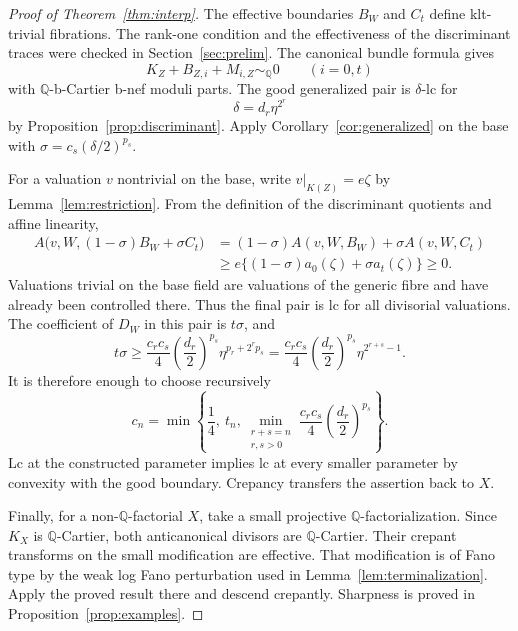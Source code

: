 \documentclass[11pt,reqno]{amsart}
\numberwithin{equation}{section}
\theoremstyle{definition}
\theoremstyle{remark}
\newcommand{\Q}{\mathbb Q}
\newcommand{\simq}{\sim_{\Q}}
\begin{document}
\begin{proof}[Proof of Theorem~\ref{thm:interp}]
The effective boundaries $B_W$ and $C_t$ define klt-trivial fibrations. The rank-one condition and the effectiveness of the discriminant traces were checked in Section~\ref{sec:prelim}. The canonical bundle formula gives
\[
 K_Z+B_{Z,i}+M_{i,Z}\simq0\qquad (i=0,t)
\]
with $\Q$-b-Cartier b-nef moduli parts. The good generalized pair is $\delta$-lc for
\[
 \delta=d_r\eta^{2^r}
\]
by Proposition~\ref{prop:discriminant}. Apply Corollary~\ref{cor:generalized} on the base with $\sigma=c_s(\delta/2)^{p_s}$.

For a valuation $v$ nontrivial on the base, write $v|_{K(Z)}=e\zeta$ by Lemma~\ref{lem:restriction}. From the definition of the discriminant quotients and affine linearity,
\begin{align*}
 A\bigl(v,W,(1-\sigma)B_W+\sigma C_t\bigr)
 &=(1-\sigma)A(v,W,B_W)+\sigma A(v,W,C_t)\\
 &\ge e\{(1-\sigma)a_0(\zeta)+\sigma a_t(\zeta)\}\ge0.
\end{align*}
Valuations trivial on the base field are valuations of the generic fibre and have already been controlled there. Thus the final pair is lc for all divisorial valuations. The coefficient of $D_W$ in this pair is $t\sigma$, and
\[
 t\sigma\ge\frac{c_rc_s}{4}
 \left(\frac{d_r}{2}\right)^{p_s}
 \eta^{p_r+2^rp_s}
 =\frac{c_rc_s}{4}\left(\frac{d_r}{2}\right)^{p_s}
 \eta^{2^{r+s}-1}.
\]
It is therefore enough to choose recursively
\begin{equation}\label{eq:cn}
 c_n=\min\left\{\frac14,\ t_n,
 \min_{\substack{r+s=n\\r,s>0}}
 \frac{c_rc_s}{4}\left(\frac{d_r}{2}\right)^{p_s}\right\}.
\end{equation}
Lc at the constructed parameter implies lc at every smaller parameter by convexity with the good boundary. Crepancy transfers the assertion back to $X$.

Finally, for a non-$\Q$-factorial $X$, take a small projective $\Q$-factorialization. Since $K_X$ is $\Q$-Cartier, both anticanonical divisors are $\Q$-Cartier. Their crepant transforms on the small modification are effective. That modification is of Fano type by the weak log Fano perturbation used in Lemma~\ref{lem:terminalization}. Apply the proved result there and descend crepantly. Sharpness is proved in Proposition~\ref{prop:examples}.
\end{proof}
\end{document}
